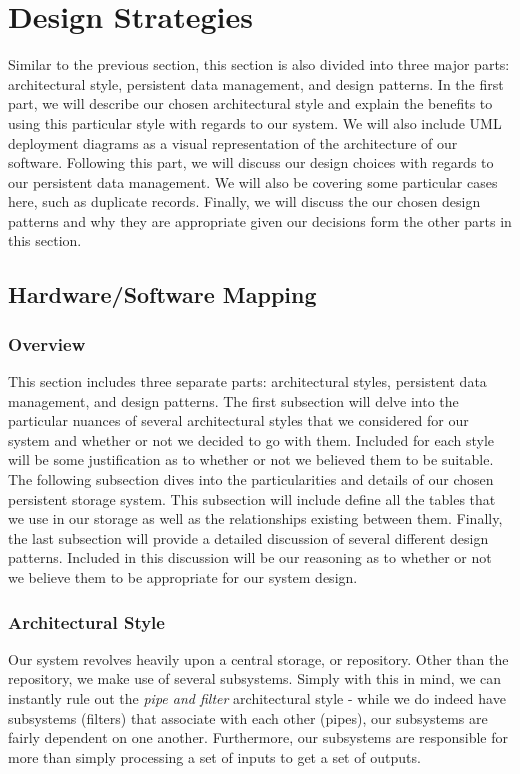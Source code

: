 \documentclass[12pt,letterpaper]{article}
\begin{document}
\section{Design Strategies}

Similar to the previous section, this section is also divided into three major parts: architectural style, persistent data management, and design patterns. In the first part, we will describe our chosen architectural style and explain the benefits to using this particular style with regards to our system. We will also include UML deployment diagrams as a visual representation of the architecture of our software. Following this part, we will discuss our design choices with regards to our persistent data management. We will also be covering some particular cases here, such as duplicate records. Finally, we will discuss the our chosen design patterns and why they are appropriate given our decisions form the other parts in this section.

\subsection{Hardware/Software Mapping}
\subsubsection{Overview}

This section includes three separate parts: architectural styles, persistent data management, and design patterns. The first subsection will delve into the particular nuances of several architectural styles that we considered for our system and whether or not we decided to go with them. Included for each style will be some justification as to whether or not we believed them to be suitable. The following subsection dives into the particularities and details of our chosen persistent storage system. This subsection will include define all the tables that we use in our storage as well as the relationships existing between them. Finally, the last subsection will provide a detailed discussion of several different design patterns. Included in this discussion will be our reasoning as to whether or not we believe them to be appropriate for our system design. 

\subsubsection{Architectural Style}

Our system revolves heavily upon a central storage, or repository. Other than the repository, we make use of several subsystems. Simply with this in mind, we can instantly rule out the {\it pipe and filter} architectural style - while we do indeed have subsystems (filters) that associate with each other (pipes), our subsystems are fairly dependent on one another. Furthermore, our subsystems are responsible for more than simply processing a set of inputs to get a set of outputs. 
\end{document}
